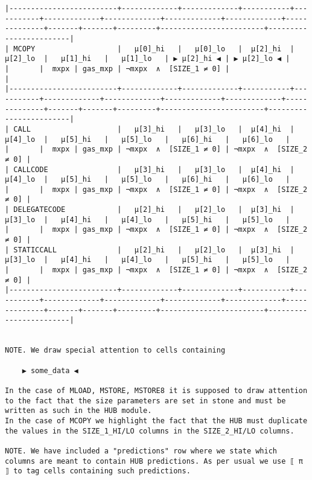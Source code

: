 \documentclass[varwidth=\maxdimen,margin=0.5cm,multi={verbatim}]{standalone}
\begin{document}
\begin{verbatim}
|-------------------------+-------------+-------------+-----------+-----------+-------------+-------------+-------------+-------------+--------------+-------+-------+---------+------------------------+------------------------|
| MCOPY                   |   μ[0]_hi   |   μ[0]_lo   |  μ[2]_hi  |  μ[2]_lo  |   μ[1]_hi   |   μ[1]_lo   | ▶ μ[2]_hi ◀ | ▶ μ[2]_lo ◀ |              |       |  mxpx | gas_mxp | ¬mxpx  ∧  [SIZE_1 ≠ 0] |                        |
|-------------------------+-------------+-------------+-----------+-----------+-------------+-------------+-------------+-------------+--------------+-------+-------+---------+------------------------+------------------------|
| CALL                    |   μ[3]_hi   |   μ[3]_lo   |  μ[4]_hi  |  μ[4]_lo  |   μ[5]_hi   |   μ[5]_lo   |   μ[6]_hi   |   μ[6]_lo   |              |       |  mxpx | gas_mxp | ¬mxpx  ∧  [SIZE_1 ≠ 0] | ¬mxpx  ∧  [SIZE_2 ≠ 0] |
| CALLCODE                |   μ[3]_hi   |   μ[3]_lo   |  μ[4]_hi  |  μ[4]_lo  |   μ[5]_hi   |   μ[5]_lo   |   μ[6]_hi   |   μ[6]_lo   |              |       |  mxpx | gas_mxp | ¬mxpx  ∧  [SIZE_1 ≠ 0] | ¬mxpx  ∧  [SIZE_2 ≠ 0] |
| DELEGATECODE            |   μ[2]_hi   |   μ[2]_lo   |  μ[3]_hi  |  μ[3]_lo  |   μ[4]_hi   |   μ[4]_lo   |   μ[5]_hi   |   μ[5]_lo   |              |       |  mxpx | gas_mxp | ¬mxpx  ∧  [SIZE_1 ≠ 0] | ¬mxpx  ∧  [SIZE_2 ≠ 0] |
| STATICCALL              |   μ[2]_hi   |   μ[2]_lo   |  μ[3]_hi  |  μ[3]_lo  |   μ[4]_hi   |   μ[4]_lo   |   μ[5]_hi   |   μ[5]_lo   |              |       |  mxpx | gas_mxp | ¬mxpx  ∧  [SIZE_1 ≠ 0] | ¬mxpx  ∧  [SIZE_2 ≠ 0] |
|-------------------------+-------------+-------------+-----------+-----------+-------------+-------------+-------------+-------------+--------------+-------+-------+---------+------------------------+------------------------|


NOTE. We draw special attention to cells containing

    ▶ some_data ◀

In the case of MLOAD, MSTORE, MSTORE8 it is supposed to draw attention to the fact that the size parameters are set in stone and must be written as such in the HUB module.
In the case of MCOPY we highlight the fact that the HUB must duplicate the values in the SIZE_1_HI/LO columns in the SIZE_2_HI/LO columns.

NOTE. We have included a "predictions" row where we state which columns are meant to contain HUB predictions. As per usual we use ⟦ π ⟧ to tag cells containing such predictions.

\end{verbatim}
\end{document}
